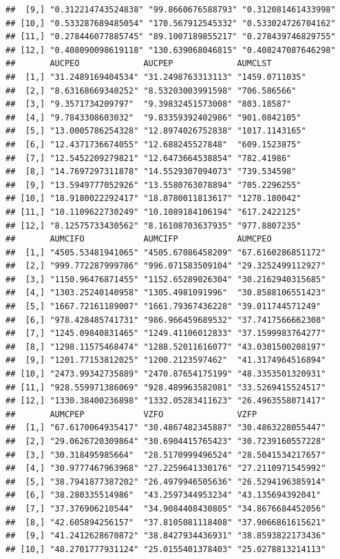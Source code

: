 \documentclass[]{krantz}
\theoremstyle{definition}
\theoremstyle{definition}
\theoremstyle{definition}
\theoremstyle{remark}
\begin{document}
\begin{verbatim}
##  [9,] "0.312214743524838" "99.8660676588793" "0.312081461433998"
## [10,] "0.533287689485054" "170.567912545332" "0.533024726704162"
## [11,] "0.278446077885745" "89.1007189855217" "0.278439746829755"
## [12,] "0.408090098619118" "130.639068046815" "0.408247087646298"
##       AUCPEO             AUCPEP             AUMCLST       
##  [1,] "31.2489169404534" "31.2498763313113" "1459.0711035"
##  [2,] "8.63168669340252" "8.53203003991598" "706.586566"  
##  [3,] "9.3571734209797"  "9.39832451573008" "803.18587"   
##  [4,] "9.7843308603032"  "9.83359392402986" "901.0842105" 
##  [5,] "13.0005786254328" "12.8974026752838" "1017.1143165"
##  [6,] "12.4371736674055" "12.688245527848"  "609.1523875" 
##  [7,] "12.5452209279821" "12.6473664538854" "782.41986"   
##  [8,] "14.7697297311878" "14.5529307094073" "739.534598"  
##  [9,] "13.5949777052926" "13.5580763078894" "705.2296255" 
## [10,] "18.9180022292417" "18.8780011813617" "1278.180042" 
## [11,] "10.1109622730249" "10.1089184106194" "617.2422125" 
## [12,] "8.12575733430562" "8.16108703637935" "977.8807235" 
##       AUMCIFO            AUMCIFP            AUMCPEO           
##  [1,] "4505.53481941065" "4505.67086458209" "67.6160286851172"
##  [2,] "999.772287999786" "996.071583509104" "29.3252499112927"
##  [3,] "1150.96476871455" "1152.65289026304" "30.2162940315685"
##  [4,] "1303.25240140958" "1305.4981091996"  "30.8588106551423"
##  [5,] "1667.72161189007" "1661.79367436228" "39.011744571249" 
##  [6,] "978.428485741731" "986.966459689532" "37.7417566662308"
##  [7,] "1245.09840831465" "1249.41106012833" "37.1599983764277"
##  [8,] "1298.11575468474" "1288.52011616077" "43.0301500208197"
##  [9,] "1201.77153812025" "1200.2123597462"  "41.3174964516894"
## [10,] "2473.99342735889" "2470.87654175199" "48.3353501320931"
## [11,] "928.559971386069" "928.489963582081" "33.5269415524517"
## [12,] "1330.38400236898" "1332.05283411623" "26.4963558071417"
##       AUMCPEP            VZFO               VZFP              
##  [1,] "67.6170064935417" "30.4867482345887" "30.4863228055447"
##  [2,] "29.0626720309864" "30.6904415765423" "30.7239160557228"
##  [3,] "30.318495985664"  "28.5170999496524" "28.5041534217657"
##  [4,] "30.9777467963968" "27.2259641330176" "27.2110971545992"
##  [5,] "38.7941877387202" "26.4979946505636" "26.5294196385914"
##  [6,] "38.280335514986"  "43.2597344953234" "43.135694392041" 
##  [7,] "37.376906210544"  "34.9084408430805" "34.8676684452056"
##  [8,] "42.605894256157"  "37.8105081118408" "37.9066861615621"
##  [9,] "41.2412628670872" "38.8427934436931" "38.8593822173436"
## [10,] "48.2701777931124" "25.0155401378403" "25.0278813214113"

\end{verbatim}
\end{document}
